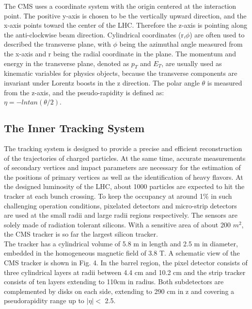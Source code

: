 \documentclass[thesis.tex]{subfiles}
\begin{document}
The CMS uses a coordinate system with the origin centered at the interaction point. The positive y-axis is chosen to be the vertically upward direction, and the x-axis points toward the center of the LHC. Therefore the z-axis is pointing along the anti-clockwise beam direction. Cylindrical coordinates (r,$\phi$) are often used to described the transverse plane, with $\phi$ being the azimuthal angle measured from the x-axis and r being the radial coordinate in the plane. The momentum and energy in the transverse plane, denoted as $p_T$ and $E_T$, are usually used as kinematic variables for physics objects, because the transverse components are invariant under Lorentz boosts in the z direction. The polar angle $\theta$ is measured from the z-axis, and the pseudo-rapidity is defined as: \\
       $\eta = -ln tan(\theta/2)$.
       
\subsection{The Inner Tracking System}
The tracking system is designed to provide a precise and efficient reconstruction of the trajectories of charged particles. 
At the same time, accurate measurements of secondary vertices and impact parameters are necessary for the estimation of the positions of primary vertices as well as the identification of heavy flavors. 
At the designed luminosity of the LHC, about 1000 particles are expected to hit the tracker at each bunch crossing. 
To keep the occupancy at around 1\% in such challenging operation conditions, pixelated detectors and micro-strip detectors are used at the small radii and large radii regions respectively. 
The sensors are solely made of radiation tolerant silicons. With a sensitive area of about 200 $m^2$, the CMS tracker is so far the largest silicon tracker.  \\

The tracker has a cylindrical volume of 5.8 m in length and 2.5 m in diameter, embedded in the homogeneous magnetic field of 3.8 T. 
A schematic view of the CMS tracker is shown in Fig. 4. 
In the barrel region, the pixel detector consists of three cylindrical layers at radii between 4.4 cm and 10.2 cm and the strip tracker consists of ten layers extending to 110cm in radius. 
Both subdetectors are complemented by disks on each side, extending to 290 cm in z and covering a pseudorapidity range up to $|\eta| <$ 2.5.  \\
\end{document}
